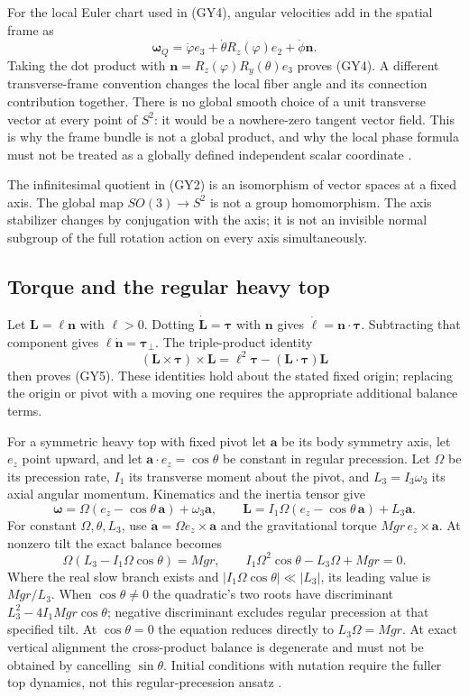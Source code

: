 For the local Euler chart used in (GY4), angular velocities add in the spatial frame as
\[
\boldsymbol\omega_Q
=\dot\varphi e_3+\dot\theta R_z(\varphi)e_2+\dot\phi\mathbf n.
\]
Taking the dot product with $\mathbf n=R_z(\varphi)R_y(\theta)e_3$ proves (GY4). A different transverse-frame convention changes the local fiber angle and its connection contribution together. There is no global smooth choice of a unit transverse vector at every point of $S^2$: it would be a nowhere-zero tangent vector field. This is why the frame bundle is not a global product, and why the local phase formula must not be treated as a globally defined independent scalar coordinate \citep{crainicbundles}.

The infinitesimal quotient in (GY2) is an isomorphism of vector spaces at a fixed axis. The global map $SO(3)\to S^2$ is not a group homomorphism. The axis stabilizer changes by conjugation with the axis; it is not an invisible normal subgroup of the full rotation action on every axis simultaneously.

\subsection{Torque and the regular heavy top}
Let $\mathbf L=\ell\mathbf n$ with $\ell>0$. Dotting $\dot{\mathbf L}=\boldsymbol\tau$ with $\mathbf n$ gives $\dot\ell=\mathbf n\cdot\boldsymbol\tau$. Subtracting that component gives $\ell\dot{\mathbf n}=\boldsymbol\tau_\perp$. The triple-product identity
\[
(\mathbf L\times\boldsymbol\tau)\times\mathbf L
=\ell^2\boldsymbol\tau-(\mathbf L\cdot\boldsymbol\tau)\mathbf L
\]
then proves (GY5). These identities hold about the stated fixed origin; replacing the origin or pivot with a moving one requires the appropriate additional balance terms.

For a symmetric heavy top with fixed pivot let $\mathbf a$ be its body symmetry axis, let $e_z$ point upward, and let $\mathbf a\cdot e_z=\cos\theta$ be constant in regular precession. Let $\Omega$ be its precession rate, $I_1$ its transverse moment about the pivot, and $L_3=I_3\omega_3$ its axial angular momentum. Kinematics and the inertia tensor give
\[
\boldsymbol\omega=\Omega(e_z-\cos\theta\,\mathbf a)+\omega_3\mathbf a,
\qquad
\mathbf L=I_1\Omega(e_z-\cos\theta\,\mathbf a)+L_3\mathbf a.
\]
For constant $\Omega,\theta,L_3$, use $\dot{\mathbf a}=\Omega e_z\times\mathbf a$ and the gravitational torque $Mgr\,e_z\times\mathbf a$. At nonzero tilt the exact balance becomes
\begin{equation}
\Omega(L_3-I_1\Omega\cos\theta)=Mgr,
\qquad
I_1\Omega^2\cos\theta-L_3\Omega+Mgr=0.
\tag{GY6}\label{eq:regulartop}
\end{equation}
Where the real slow branch exists and $|I_1\Omega\cos\theta|\ll|L_3|$, its leading value is $Mgr/L_3$. When $\cos\theta\ne0$ the quadratic's two roots have discriminant $L_3^2-4I_1Mgr\cos\theta$; negative discriminant excludes regular precession at that specified tilt. At $\cos\theta=0$ the equation reduces directly to $L_3\Omega=Mgr$. At exact vertical alignment the cross-product balance is degenerate and must not be obtained by cancelling $\sin\theta$. Initial conditions with nutation require the fuller top dynamics, not this regular-precession ansatz \citep{feynmanrotation}.

